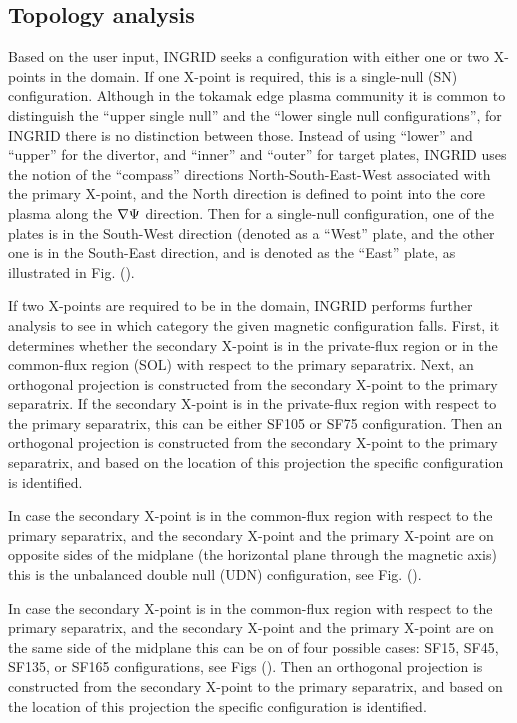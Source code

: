 \subsection{Topology analysis}

Based on the user input, INGRID seeks a configuration with either one
or two X-points in the domain. If one X-point is required, this is a
single-null (SN) configuration. Although in the tokamak edge plasma
community it is common to distinguish the ``upper single null'' and
the ``lower single null configurations'', for INGRID there is no
distinction between those. Instead of using ``lower'' and ``upper''
for the divertor, and ``inner'' and ``outer'' for target plates,
INGRID uses the notion of the ``compass'' directions
North-South-East-West associated with the primary X-point, and the
North direction is defined to point into the core plasma along the
$\nabla \Psi$ direction. Then for a single-null configuration, one of
the plates is in the South-West direction (denoted as a ``West''
plate, and the other one is in the South-East direction, and is
denoted as the ``East'' plate, as illustrated in Fig. ().

If two X-points are required to be in the domain, INGRID performs
further analysis to see in which category the given magnetic
configuration falls. First, it determines whether the secondary
X-point is in the private-flux region or in the common-flux region
(SOL) with respect to the primary separatrix. Next, an orthogonal
projection is constructed from the secondary X-point to the primary
separatrix. If the secondary X-point is in the private-flux region
with respect to the primary separatrix, this can be either SF105 or
SF75 configuration.  Then an orthogonal projection is constructed from
the secondary X-point to the primary separatrix, and based on the
location of this projection the specific configuration is identified.

In case the secondary X-point is in the common-flux region with
respect to the primary separatrix, and the secondary X-point and the
primary X-point are on opposite sides of the midplane (the horizontal
plane through the magnetic axis) this is the unbalanced double null
(UDN) configuration, see Fig. ().

In case the secondary X-point is in the common-flux region with
respect to the primary separatrix, and the secondary X-point and the
primary X-point are on the same side of the midplane this can be on of
four possible cases: SF15, SF45, SF135, or SF165 configurations, see
Figs (). Then an orthogonal projection is constructed from the
secondary X-point to the primary separatrix, and based on the location
of this projection the specific configuration is identified.

